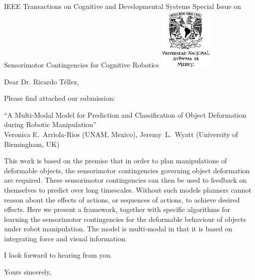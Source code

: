 \documentclass[a4paper,12pt]{letter}
\begin{document}

\begin{letter}{IEEE Transactions on Cognitive and Developmental Systems\newline
Special Issue on Sensorimotor Contingencies for Cognitive Robotics}
\includegraphics[height=3cm, keepaspectratio=true]{figures/unam.jpg}\vspace*{-3cm}
\address{Facultad de Ciencias, \\Ciudad Universitaria,\\ UNAM, México, D.F.}

\opening{Dear Dr. Ricardo Téllez,}

Please find attached our submission:
\begin{center}
 ``A Multi-Modal Model for Prediction and Classification of Object Deformation during Robotic Manipulation'' \\
 Veronica E.~Arriola-Rios (UNAM, Mexico), Jeremy~L.~Wyatt (University of Birmingham, UK)
\end{center}

This work is based on the premise that in order to plan manipulations of deformable objects, the sensorimotor contingencies governing object deformation are required. These sensorimotor contingencies can then be used to feedback on themselves to predict over long timescales. Without such models planners cannot reason about the effects of actions, or sequences of actions, to achieve desired effects.
Here we present a framework, together with specific algorithms for learning the sensorimotor contingencies for the deformable behaviour of objects under robot manipulation.
The model is multi-modal in that it is based on integrating force and visual information.

I look forward to hearing from you.


\signature{Dra. Verónica Esther Arriola Ríos\\
Profesora Asociada C de T.C.\newline
Departamento de Matemáticas, Cub 119.\newline
Facultad de Ciencias, UNAM \newline
v.arriola@ciencias.unam.mx \newline
+(52)55 5622 5426}

\closing{Yours sincerely,}


\end{letter}
\end{document}
